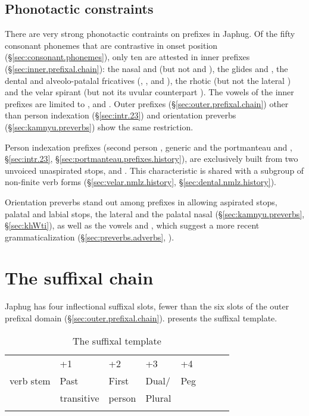 \subsection{Phonotactic constraints} \label{sec:prefix.phonotactic}
There are very strong phonotactic contraints on prefixes in Japhug. Of the fifty consonant phonemes that are contrastive in onset position (§\ref{sec:consonant.phonemes}), only ten are attested in inner prefixes (§\ref{sec:inner.prefixal.chain}): the nasal  and  (but not  and ), the glides  and , the dental and alveolo-patalal fricatives (, ,  and ), the rhotic  (but not the lateral ) and the velar spirant  (but not its uvular counterpart ). The vowels of the inner prefixes are limited to ,  and . Outer prefixes (§\ref{sec:outer.prefixal.chain}) other than person indexation (§\ref{sec:intr.23}) and orientation preverbs (§\ref{sec:kamnyu.preverbs}) show the same restriction.
 
Person indexation prefixes (second person , generic  and the portmanteau  and , §\ref{sec:intr.23}, §\ref{sec:portmanteau.prefixes.history}), are exclusively built from two  unvoiced unaspirated stops,   and . This characteristic is shared with a subgroup of non-finite verb forms (§\ref{sec:velar.nmlz.history}, §\ref{sec:dental.nmlz.history}).
  
Orientation preverbs stand out among prefixes in allowing aspirated stops, palatal and labial stops, the lateral  and the palatal nasal (§\ref{sec:kamnyu.preverbs}, §\ref{sec:khWti}), as well as the vowels  and , which suggest a more recent grammaticalization (§\ref{sec:preverbs.adverbs}, \citealt[92]{jacques12agreement}).  

\section{The suffixal chain}  \label{sec:suffixes}
Japhug has four inflectional suffixal slots, fewer than the six slots of the outer prefixal domain (§\ref{sec:outer.prefixal.chain}).  presents the suffixal template.

\begin{table}
\caption{The suffixal template }\label{tab:template.suff}
\begin{tabular}{llllllll}
\lsptoprule
  0  &+1&+2&+3&+4  \\
verb stem & Past & First  & Dual/ & Peg\\
&transitive &person&Plural&\\
\lspbottomrule
\end{tabular}
\end{table}

